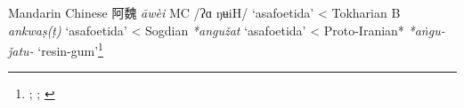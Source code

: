 \begin{etymology}\label{ety:awei}
Mandarin Chinese {阿魏} \textit{āwèi} \gls{MC} /ʔɑ ŋʉiH/ `asafoetida'
< Tokharian B \textit{ankwaṣ(ṭ)} `asafoetida'
< Sogdian \textit{*angužat} `asafoetida'
< Proto-Iranian* \textit{*aṅgu-ǰatu-} `resin-gum'\footnote{\textcite{leung_itinerary_2019}; \textcite[353]{laufer_sino-iranica_1919}; \textcite[438]{tremblay_irano-tocharica_2005}}
\end{etymology}